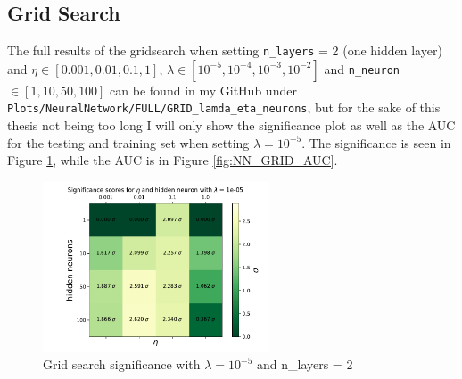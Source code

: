 \documentclass[14pt, a4paper]{book}
\begin{document}
\subsection{Grid Search}\label{sec:NNGriddy_res}
The full results of the gridsearch when setting \verb|n_layers| = 2 (one hidden layer) and $\eta \in [0.001, 0.01, 0.1, 1]$, $\lambda\in[10^{-5},10^{-4},10^{-3},10^{-2}]$ and \verb|n_neuron|$\in[1, 10, 50, 100]$ can be found in my GitHub under \\\verb|Plots/NeuralNetwork/FULL/GRID_lamda_eta_neurons|, 
but for the sake of this thesis not being too long I will only show the significance plot as well as the AUC for the testing and training set when setting $\lambda=10^{-5}$. 
The significance is seen in Figure \ref{fig:NN_GRID_SIG}, while the AUC is in Figure \ref{fig:NN_GRID_AUC}.\\
\graphicspath{{../../../Plots/NeuralNetwork/FULL/GRID_lamda_eta_neurons}}
\begin{figure}[!ht]
      \centering
      \includegraphics[width=0.6\textwidth]{Significance_ne.pdf}
      \caption{Grid search significance with $\lambda=10^{-5}$ and n\_layers = 2}\label{fig:NN_GRID_SIG}
\end{figure}
\graphicspath{{../../../Plots/NeuralNetwork/FULL/GRID_lamda_eta_neurons/AUC}}
\end{document}
